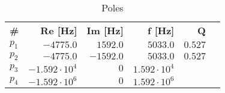 \begin{table}[H]
\centering
\begin{tabular}[c]{lrrrrr}
\textbf{\#} & \textbf{Re [Hz]} & \textbf{Im [Hz]} & \textbf{f [Hz]} & \textbf{Q} \\ 
\rowcolor{myyellow}
$p_{1}$ &$-4775.0$ &$1592.0$ &$5033.0$ &$0.527$ \\ 
$p_{2}$ &$-4775.0$ &$-1592.0$ &$5033.0$ &$0.527$ \\ 
\rowcolor{myyellow}
$p_{3}$ &$-1.592 \cdot 10^{4}$ &$0$ &$1.592 \cdot 10^{4}$ \\ 
$p_{4}$ &$-1.592 \cdot 10^{6}$ &$0$ &$1.592 \cdot 10^{6}$ \\ 
\end{tabular}
\caption{Poles}
\end{table}

